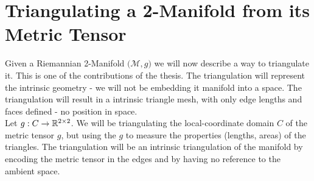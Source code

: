 {\begin{center}
        \label{fig:circumcentric_dual}
    \end{center}
}
\section*{Triangulating a 2-Manifold from its Metric Tensor}
Given a Riemannian 2-Manifold $\big(\mathcal{M}, g\big)$ we will now describe a way to triangulate it. This is one of the contributions of the thesis. The triangulation will represent the intrinsic geometry - we will not be embedding it manifold into a space. The triangulation will result in a intrinsic triangle mesh, with only edge lengths and faces defined - no position in space.
\\ 
Let $g : C \to \mathbb{R}^{2\times2}$. We will be triangulating the local-coordinate domain $C$ of the metric tensor $g$, but using the $g$ to measure the properties (lengths, areas) of the triangles. The triangulation will be an intrinsic triangulation of the manifold by encoding the metric tensor in the edges and by having no reference to the ambient space.
\\
